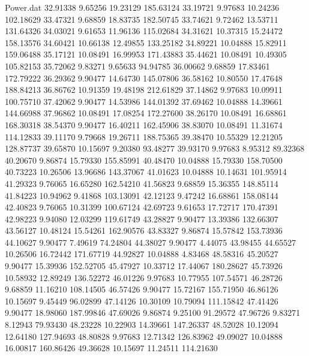 \begin{filecontents}{Power.dat}
  32.91338    9.65256   19.23129  185.63124
  33.19721    9.97683   10.24236  102.18629
  33.47321    9.68859   18.83735  182.50745
  33.74621    9.72462   13.53711  131.64326
  34.03021    9.61653   11.96136  115.02684
  34.31621   10.37315   15.24472  158.13576
  34.60421   10.66138   12.49855  133.25182
  34.89221   10.04888   15.82911  159.06488
  35.17121   10.08491   16.99953  171.43883
  35.44621   10.08491   10.49305  105.82153
  35.72062    9.83271    9.65633   94.94785
  36.00662    9.68859   17.83461  172.79222
  36.29362    9.90477   14.64730  145.07806
  36.58162   10.80550   17.47648  188.84213
  36.86762   10.91359   19.48198  212.61829
  37.14862    9.97683   10.09911  100.75710
  37.42062    9.90477   14.53986  144.01392
  37.69462   10.04888   14.39661  144.66988
  37.96862   10.08491   17.08254  172.27600
  38.26170   10.08491   16.68861  168.30318
  38.54370    9.90477   16.40211  162.45906
  38.83070   10.08491   11.31674  114.12833
  39.11170    9.79668   19.26711  188.75365
  39.38470   10.55329   12.21205  128.87737
  39.65870   10.15697    9.20380   93.48277
  39.93170    9.97683    8.95312   89.32368
  40.20670    9.86874   15.79330  155.85991
  40.48470   10.04888   15.79330  158.70500
  40.73223   10.26506   13.96686  143.37067
  41.01623   10.04888   10.14631  101.95914
  41.29323    9.76065   16.65280  162.54210
  41.56823    9.68859   15.36355  148.85114
  41.84223   10.94962    9.41868  103.13091
  42.12123    9.47242   16.68861  158.08144
  42.40823    9.76065   10.31399  100.67124
  42.69723    9.61653   17.72717  170.47391
  42.98223    9.94080   12.03299  119.61749
  43.28827    9.90477   13.39386  132.66307
  43.56127   10.48124   15.54261  162.90576
  43.83327    9.86874   15.57842  153.73936
  44.10627    9.90477    7.49619   74.24804
  44.38027    9.90477    4.44075   43.98455
  44.65527   10.26506   16.72442  171.67719
  44.92827   10.04888    4.83468   48.58316
  45.20527    9.90477   15.39936  152.52705
  45.47927   10.33712   17.44067  180.28627
  45.73926   10.58932   12.89249  136.52272
  46.01226    9.97683   10.77955  107.54571
  46.28726    9.68859   11.16210  108.14505
  46.57426    9.90477   15.72167  155.71950
  46.86126   10.15697    9.45449   96.02899
  47.14126   10.30109   10.79094  111.15842
  47.41426    9.90477   18.98060  187.99846
  47.69026    9.86874    9.25100   91.29572
  47.96726    9.83271    8.12943   79.93430
  48.23228   10.22903   14.39661  147.26337
  48.52028   10.12094   12.64180  127.94693
  48.80828    9.97683   12.71342  126.83962
  49.09027   10.04888   16.00817  160.86426
  49.36628   10.15697   11.24511  114.21630

\end{filecontents}
